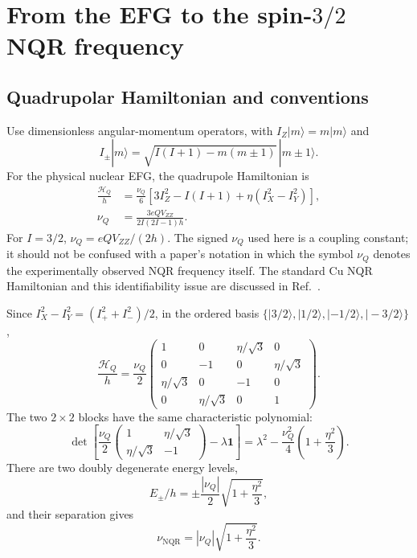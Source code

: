 \documentclass[11pt,a4paper]{article}
\newcommand{\Id}{\mathbf 1}
\newcommand{\nuq}{\nu_Q}
\newcommand{\nunqr}{\nu_{\mathrm{NQR}}}
\begin{document}
\section{From the EFG to the \texorpdfstring{spin-$3/2$}{spin-3/2} NQR frequency}

\subsection{Quadrupolar Hamiltonian and conventions}

Use dimensionless angular-momentum operators, with
$I_Z|m\rangle=m|m\rangle$ and
\begin{equation}
 I_\pm|m\rangle=
 \sqrt{I(I+1)-m(m\pm1)}\,|m\pm1\rangle.
\end{equation}
For the physical nuclear EFG, the quadrupole Hamiltonian is
\begin{align}
 \frac{\mathcal H_Q}{h}
 &=\frac{\nuq}{6}
 \left[3I_Z^2-I(I+1)+\eta(I_X^2-I_Y^2)\right],\\
 \nuq&=\frac{3eQV_{ZZ}}{2I(2I-1)h}.
\label{eq:nuqdef}
\end{align}
For $I=3/2$, $\nuq=eQV_{ZZ}/(2h)$. The signed $\nuq$ used here is a coupling
constant; it should not be confused with a paper's notation in which the symbol
$\nu_Q$ denotes the experimentally observed NQR frequency itself. The standard
Cu NQR Hamiltonian and this identifiability issue are discussed in
Ref.~\cite{Gainov2009}.

Since $I_X^2-I_Y^2=(I_+^2+I_-^2)/2$, in the ordered basis
$\{|3/2\rangle,|1/2\rangle,|-1/2\rangle,|-3/2\rangle\}$,
\begin{equation}
 \frac{\mathcal H_Q}{h}=\frac{\nuq}{2}
 \begin{pmatrix}
 1&0&\eta/\sqrt3&0\\
 0&-1&0&\eta/\sqrt3\\
 \eta/\sqrt3&0&-1&0\\
 0&\eta/\sqrt3&0&1
 \end{pmatrix}.
\end{equation}
The two $2\times2$ blocks have the same characteristic polynomial:
\begin{equation}
 \det\left[
 \frac{\nuq}{2}
 \begin{pmatrix}1&\eta/\sqrt3\\\eta/\sqrt3&-1\end{pmatrix}
 -\lambda\Id\right]
 =\lambda^2-\frac{\nuq^2}{4}\left(1+\frac{\eta^2}{3}\right).
\end{equation}
There are two doubly degenerate energy levels,
\begin{equation}
 E_\pm/h=\pm\frac{|\nuq|}{2}\sqrt{1+\frac{\eta^2}{3}},
\end{equation}
and their separation gives
\begin{equation}
 \boxed{\nunqr=|\nuq|\sqrt{1+\frac{\eta^2}{3}}.}
\label{eq:nqr}
\end{equation}
\end{document}
